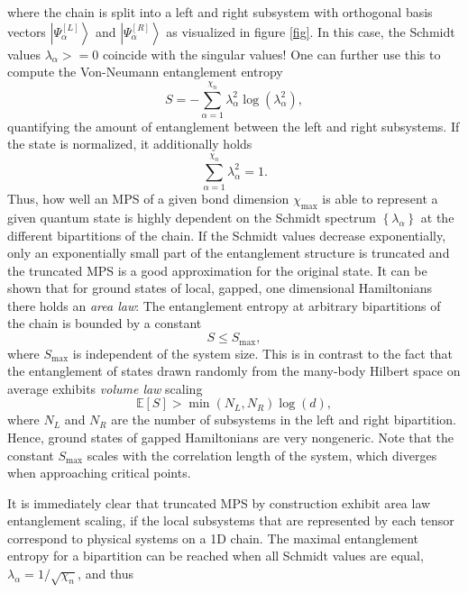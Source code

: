 where the chain is split into a left and right subsystem with orthogonal basis vectors $\left|\Psi^{[L]}_\alpha\right\rangle$ and $\left|\Psi^{[R]}_\alpha\right\rangle$ as visualized in figure \ref{fig}. In this case, the Schmidt values $\lambda_\alpha >= 0$ coincide with the singular values! One can further use this to compute the Von-Neumann entanglement entropy
\begin{equation}
	S = -\sum_{\alpha=1}^{\chi_n} \lambda_\alpha^2 \log\left(\lambda_\alpha^2\right),
\end{equation}
quantifying the amount of entanglement between the left and right subsystems. If the state is normalized, it additionally holds
\begin{equation}
	\sum_{\alpha=1}^{\chi_n} \lambda_\alpha^2 = 1.
\end{equation}
Thus, how well an MPS of a given bond dimension $\chi_\text{max}$ is able to represent a given quantum state is highly dependent on the Schmidt spectrum $\left\{\lambda_\alpha\right\}$ at the different bipartitions of the chain. If the Schmidt values decrease exponentially, only an exponentially small part of the entanglement structure is truncated and the truncated MPS is a good approximation for the original state. It can be shown \cite{cite:area_law_1D_proof, cite:area_laws_review} that for ground states of local, gapped, one dimensional Hamiltonians there holds an \textit{area law}: The entanglement entropy at arbitrary bipartitions of the chain is bounded by a constant
\begin{equation}
	S \le S_\text{max}, 
\end{equation}
where $S_\text{max}$ is independent of the system size. This is in contrast to the fact that the entanglement of states drawn randomly from the many-body Hilbert space on average exhibits \textit{volume law} scaling
\begin{equation}
	\mathbb{E}\left[S\right] > \min\left(N_L, N_R\right)\log(d),
\end{equation}
where $N_L$ and $N_R$ are the number of subsystems in the left and right bipartition. Hence, ground states of gapped Hamiltonians are very nongeneric. Note that the constant $S_\text{max}$ scales with the correlation length of the system, which diverges when approaching critical points. \par
It is immediately clear that truncated MPS by construction exhibit area law entanglement scaling, if the local subsystems that are represented by each tensor correspond to physical systems on a 1D chain. The maximal entanglement entropy for a bipartition can be reached when all Schmidt values are equal, $\lambda_\alpha = 1/\sqrt{\chi_n}$, and thus
